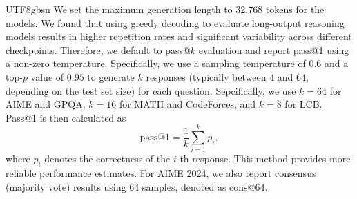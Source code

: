 \documentclass[11pt, a4paper, logo, copyright, nonumbering]{deepseek}
\begin{document}
\begin{CJK*}{UTF8}{gbsn}
\label{sec: evaluation_set}
We set the maximum generation length to 32,768 tokens for the models.
We found that using greedy decoding to evaluate long-output reasoning models results in higher repetition rates and significant variability across different checkpoints.
Therefore, we default to pass@$k$ evaluation \citep{codex} and report pass@1 using a non-zero temperature.
Specifically, we use a sampling temperature of $0.6$ and a top-$p$ value of $0.95$ to generate $k$ responses (typically between $4$ and $64$, depending on the test set size) for each question.
Sepcifically, we use $k=64$ for AIME and GPQA, $k=16$ for MATH and CodeForces, and $k=8$ for LCB.
Pass@1 is then calculated as
\[
\text{pass@1} = \frac{1}{k} \sum_{i=1}^{k} p_i,
\]
where $p_i$ denotes the correctness of the $i$-th response. This method provides more reliable performance estimates.
For AIME 2024, we also report consensus (majority vote) results using $64$ samples, denoted as $\text{cons}@64$.


\end{CJK*}
\end{document}
